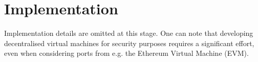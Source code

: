 \section{Implementation}\label{sec:implementation}
Implementation details are omitted at this stage. One can note that developing decentralised virtual machines for security purposes requires a significant effort, even when considering ports from e.g. the Ethereum Virtual Machine (EVM).